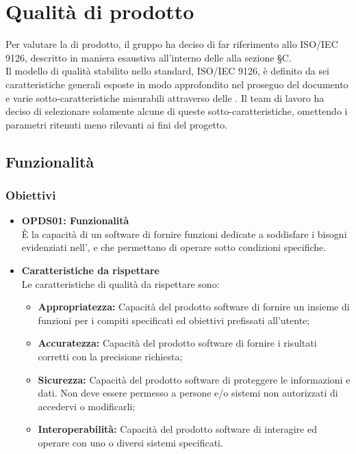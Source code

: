 \section{Qualità di prodotto}
\label{qualità_prodotto}
Per valutare la  di prodotto, il gruppo {\Gruppo} ha deciso di far riferimento allo  ISO/IEC 9126, descritto in maniera esaustiva all'interno delle  alla sezione \S{C}.\\
Il modello di qualità stabilito nello standard, ISO/IEC 9126, è definito da sei caratteristiche generali esposte in modo approfondito nel proseguo del documento e varie sotto-caratteristiche misurabili attraverso delle . Il team di lavoro ha deciso di selezionare solamente alcune di queste sotto-caratteristiche, omettendo i parametri ritenuti meno rilevanti ai fini del progetto.
\subsection{Funzionalità}
\subsubsection{Obiettivi}
\begin{itemize}
	\item \textbf{OPDS01: Funzionalità}\\
	È la capacità di un software di fornire funzioni dedicate a soddisfare i bisogni evidenziati nell'\AdR{}, e che permettano di operare sotto  condizioni specifiche.
	\item \textbf{Caratteristiche da rispettare}\\
	Le caratteristiche di qualità da rispettare sono:
	\begin{itemize}
		\item \textbf{Appropriatezza:} Capacità del prodotto software di fornire un insieme di funzioni per i compiti specificati ed obiettivi prefissati all'utente;
		\item \textbf{Accuratezza:} Capacità del prodotto software di fornire i risultati corretti con la precisione richiesta;
		\item \textbf{Sicurezza:} Capacità del prodotto software di proteggere le informazioni e dati. Non deve essere permesso a persone e/o sistemi non autorizzati di accedervi o modificarli;
		\item \textbf{Interoperabilità:} Capacità del prodotto software di interagire ed operare con uno o diversi sistemi specificati.
	\end{itemize}
\end{itemize}
